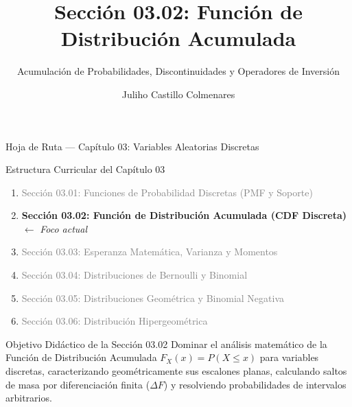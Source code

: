 \documentclass[10pt, aspectratio=169]{beamer}
\title[Función de Distribución Acumulada]{Sección 03.02: Función de Distribución Acumulada}
\subtitle{Acumulación de Probabilidades, Discontinuidades y Operadores de Inversión}
\author[J. Castillo Colmenares]{Juliho Castillo Colmenares}
\institute{Tecnológico de Monterrey}
\date{\vspace{-2.0cm}}
\begin{document}
\begin{frame}[plain]
  \vspace{-0.5cm}
  \titlepage
\end{frame}

\begin{frame}{Hoja de Ruta — Capítulo 03: Variables Aleatorias Discretas}
  \begin{block}{Estructura Curricular del Capítulo 03}
    \footnotesize
    \begin{enumerate}\itemsep=0.08cm
      \item \textcolor{gray}{Sección 03.01: Funciones de Probabilidad Discretas (PMF y Soporte)}
      \item \textbf{\textcolor{TecRojo}{Sección 03.02: Función de Distribución Acumulada (CDF Discreta)}} $\leftarrow$ \emph{Foco actual}
      \item \textcolor{gray}{Sección 03.03: Esperanza Matemática, Varianza y Momentos}
      \item \textcolor{gray}{Sección 03.04: Distribuciones de Bernoulli y Binomial}
      \item \textcolor{gray}{Sección 03.05: Distribuciones Geométrica y Binomial Negativa}
      \item \textcolor{gray}{Sección 03.06: Distribución Hipergeométrica}
    \end{enumerate}
  \end{block}
  \vspace{-0.05cm}
  \pause
  \begin{alertblock}{Objetivo Didáctico de la Sección 03.02}
    \footnotesize
    Dominar el análisis matemático de la Función de Distribución Acumulada $F_X(x) = P(X \le x)$ para variables discretas, caracterizando geométricamente sus escalones planas, calculando saltos de masa por diferenciación finita ($\Delta F$) y resolviendo probabilidades de intervalos arbitrarios.
  \end{alertblock}
\end{frame}
\end{document}
